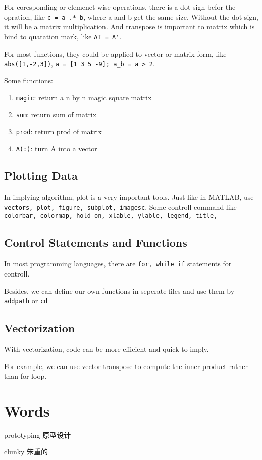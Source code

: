 \documentclass[en,11pt,english,black,simple]{../elegantbook}
\begin{document}
For coresponding or elemenet-wise operations, there is a dot sign befor the opration, like \lstinline{c = a .* b}, where a and b get the same size. Without the dot sign, it will be a matrix multiplication. And transpose is important to matrix which is bind to quatation mark, like \lstinline{AT = A'}.

For most functions, they could be applied to vector or matrix form, like \lstinline{abs([1,-2,3])}, \lstinline{a = [1 3 5 -9]; a_b = a > 2}.



Some functions:

\begin{enumerate}
    \item \lstinline{magic}: return a n by n magic square matrix
    \item \lstinline{sum}: return sum of matrix
    \item \lstinline{prod}: return prod of matrix
    \item \lstinline{A(:)}: turn A into a vector
\end{enumerate}

\subsection{Plotting Data}

In implying algorithm, plot is a very important tools. Just like in MATLAB, use \lstinline{vectors, plot, figure, subplot, imagesc}. Some controll command like \lstinline{colorbar, colormap, hold on, xlable, ylable, legend, title,}

\subsection{Control Statements and Functions}

In most programming languages, there are \lstinline{for, while if} statements for controll.

Besides, we can define our own functions in seperate files and use them by \lstinline{addpath} or \lstinline{cd}

\subsection{Vectorization}

With vectorization, code can be more efficient and quick to imply.

For example, we can use vector transpose to compute the inner product rather than for-loop.



\section*{Words}

prototyping 原型设计

clunky 笨重的


\let\chapname\undefined
\ifx\mainclass\undefined
\end{document}
